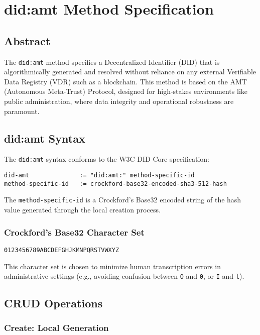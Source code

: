 \chapter{did:amt Method Specification}

\section{Abstract}

The \texttt{did:amt} method specifies a Decentralized Identifier (DID) that is algorithmically generated and resolved without reliance on any external Verifiable Data Registry (VDR) such as a blockchain. This method is based on the AMT (Autonomous Meta-Trust) Protocol, designed for high-stakes environments like public administration, where data integrity and operational robustness are paramount.

\section{did:amt Syntax}

The \texttt{did:amt} syntax conforms to the W3C DID Core specification:

\begin{verbatim}
did-amt              := "did:amt:" method-specific-id
method-specific-id   := crockford-base32-encoded-sha3-512-hash
\end{verbatim}

The \texttt{method-specific-id} is a Crockford's Base32 encoded string of the hash value generated through the local creation process.

\subsection{Crockford's Base32 Character Set}

\texttt{0123456789ABCDEFGHJKMNPQRSTVWXYZ}

This character set is chosen to minimize human transcription errors in administrative settings (e.g., avoiding confusion between \texttt{O} and \texttt{0}, or \texttt{I} and \texttt{l}).

\section{CRUD Operations}

\subsection{Create: Local Generation}

